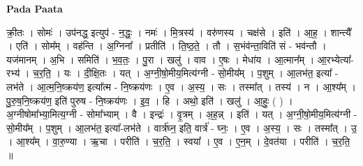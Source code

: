 \documentclass[17pt]{extarticle}
\begin{document}
\textbf{Pada Paata} \newline

क्री॒तः । सोमः॑ । उप॑नद्ध॒ इत्युप॑ - न॒द्धः॒ । नमः॑ । मि॒त्रस्य॑ । वरु॑णस्य । चक्ष॑से । इति॑ । आ॒ह॒ । शान्त्यै᳚ । एति॑ । सोम᳚म् । वह॑न्ति । अ॒ग्निना᳚ । प्रतीति॑ । ति॒ष्ठ॒ते॒ । तौ । स॒भंव॑न्ता॒विति॑ सं - भव॑न्तौ । यज॑मानम् । अ॒भि । समिति॑ । भ॒व॒तः॒ । पु॒रा । खलु॑ । वाव । ए॒षः । मेधा॑य । आ॒त्मान᳚म् । आ॒रभ्येत्या᳚-रभ्य॑ । च॒र॒ति॒ । यः । दी॒क्षि॒तः । यत् । अ॒ग्नी॒षो॒मीय॒मित्य॑ग्नी - सो॒मीय᳚म् । प॒शुम् । आ॒लभ॑त॒ इत्या᳚ - लभ॑ते । आ॒त्म॒नि॒ष्क्रय॑ण॒ इत्या᳚त्म - नि॒ष्क्रय॑णः । ए॒व । अ॒स्य॒ । सः । तस्मा᳚त् । तस्य॑ । न । आ॒श्य᳚म् । पु॒रु॒ष॒नि॒ष्क्रय॑ण॒ इति॑ पुरुष - नि॒ष्क्रय॑णः । इ॒व॒ । हि । अथो॒ इति॑ । खलु॑ । आ॒हुः॒ ( ) । अ॒ग्नीषोमा᳚भ्या॒मित्य॒ग्नी - सोमा᳚भ्याम् । वै । इन्द्रः॑ । वृ॒त्रम् । अ॒ह॒न्न् । इति॑ । यत् । अ॒ग्नी॒षो॒मीय॒मित्य॑ग्नी - सो॒मीय᳚म् । प॒शुम् । आ॒लभ॑त॒ इत्या᳚-लभ॑ते । वार्त्र॑घ्न॒ इति॒ वार्त्र॑ - घ्नः॒ । ए॒व । अ॒स्य॒ । सः । तस्मा᳚त् । उ॒ । आ॒श्य᳚म् । वा॒रु॒ण्या । ऋ॒चा । परीति॑ । च॒र॒ति॒ । स्वया᳚ । ए॒व । ए॒न॒म् । दे॒वत॑या । परीति॑ । च॒र॒ति॒ ॥  \newline
\end{document}
